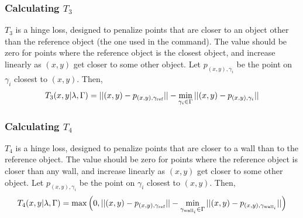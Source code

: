 \documentclass[12pt,letterpaper]{article}
\newcommand\refobj{\textmd{ref}}
\begin{document}
\subsubsection{Calculating $T_3$}
$T_3$ is a hinge loss, designed to penalize points that are closer to an object other than the reference object (the one used in the command). The value should be zero for points where the reference object is the closest object, and increase linearly as $(x, y)$ get closer to some other object. Let $p_{(x, y), \gamma_i}$ be the point on $\gamma_i$ closest to $(x, y)$. Then,
\[
T_3(x, y|\lambda, \Gamma) = ||(x, y) - p_{(x, y), \gamma_{\refobj}}|| - \min_{\gamma_i \in \Gamma} ||(x, y) - p_{(x, y), \gamma_i}||
\]

\subsubsection{Calculating $T_4$}
$T_4$ is a hinge loss, designed to penalize points that are closer to a wall than to the reference object. The value should be zero for points where the reference object is closer than any wall, and increase linearly as $(x, y)$ get closer to some other object. Let $p_{(x, y), \gamma_i}$ be the point on $\gamma_i$ closest to $(x, y)$. Then,
\[
T_4(x, y|\lambda, \Gamma) = \max\Big(0, ||(x, y) - p_{(x, y), \gamma_{\refobj}}|| - \min_{\gamma_{\textmd{wall}_i} \in \Gamma} ||(x, y) - p_{(x, y), \gamma_{\textmd{wall}_i}}||\Big)
\]
\end{document}
